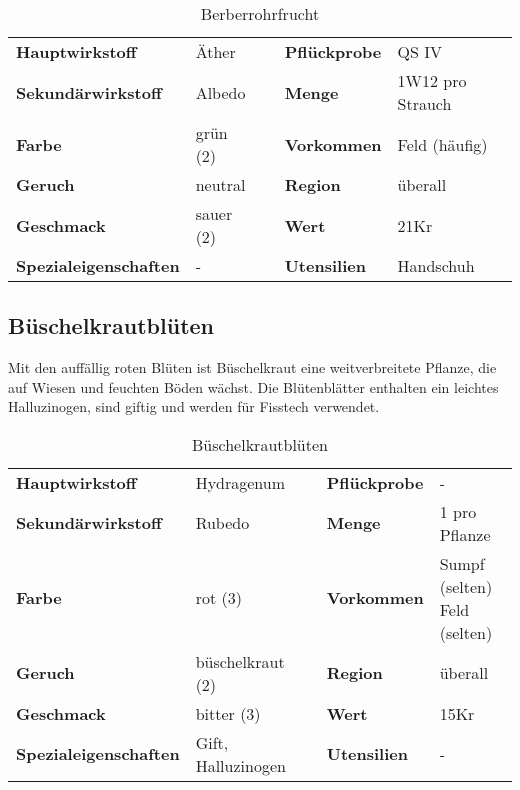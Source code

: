 \begin{table}[h]
\begin{center}
\begin{tabular}{|l|l|p{1cm}|l|l|}
	\cline{1-2} \cline{4-5}
	\textbf{Hauptwirkstoff} & Äther && \textbf{Pflückprobe} & QS IV \\ \cline{1-2} \cline{4-5}
	\textbf{Sekundärwirkstoff} & Albedo && \textbf{Menge} & 1W12 pro Strauch \\ \cline{1-2} \cline{4-5}
	\textbf{Farbe} & grün (2) && \textbf{Vorkommen} & Feld (häufig) \\ \cline{1-2} \cline{4-5}
	\textbf{Geruch} & neutral && \textbf{Region} & überall \\ \cline{1-2} \cline{4-5}
	\textbf{Geschmack} & sauer (2) && \textbf{Wert} & 21Kr \\ \cline{1-2} \cline{4-5}
	\textbf{Spezialeigenschaften} & - && \textbf{Utensilien} & Handschuh \\ \cline{1-2} \cline{4-5}
\end{tabular}
\end{center}
\caption{Berberrohrfrucht}
\label{tab:berberrohrfrucht}
\end{table}


\subsection{Büschelkrautblüten}
Mit den auffällig roten Blüten ist Büschelkraut eine weitverbreitete Pflanze, die auf Wiesen und feuchten Böden wächst. Die Blütenblätter enthalten ein leichtes Halluzinogen, sind giftig und werden für Fisstech verwendet. 
\newpage
\begin{table}[h] 
\begin{center} 
\begin{tabular}{|l|l|p{1cm}|l|l|} 
  	\cline{1-2} \cline{4-5} 
  	\textbf{Hauptwirkstoff} & Hydragenum && \textbf{Pflückprobe} & - \\ \cline{1-2} \cline{4-5} 
  	\textbf{Sekundärwirkstoff} & Rubedo && \textbf{Menge} & 1 pro Pflanze \\ \cline{1-2} \cline{4-5} 
  	\textbf{Farbe} & rot (3) && \textbf{Vorkommen} & \brcell{Sumpf (selten)\\Feld (selten)} \\ \cline{1-2} \cline{4-5} 
  	\textbf{Geruch} & büschelkraut (2) && \textbf{Region} & überall \\ \cline{1-2} \cline{4-5} 
  	\textbf{Geschmack} & bitter (3) && \textbf{Wert} & 15Kr \\ \cline{1-2} \cline{4-5} 
  	\textbf{Spezialeigenschaften} & Gift, Halluzinogen && \textbf{Utensilien} & - \\ \cline{1-2} \cline{4-5} 
\end{tabular} 
\end{center} 
\caption{Büschelkrautblüten} 
\label{tab:bueschelkrautblueten} 
\end{table}


